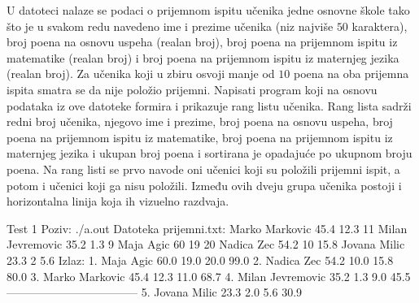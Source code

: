 \begin{Exercise}[label=705]
U datoteci  nalaze se podaci o prijemnom ispitu učenika jedne osnovne škole tako što je u svakom redu navedeno ime i prezime učenika (niz najviše $50$ karaktera), broj poena na osnovu uspeha (realan broj), broj poena na prijemnom ispitu iz matematike (realan broj) i broj poena na prijemnom ispitu iz maternjeg jezika (realan broj). Za učenika koji u zbiru osvoji manje od $10$ poena na oba prijemna ispita smatra se da nije položio prijemni. Napisati program koji na osnovu podataka iz ove datoteke formira i prikazuje rang listu učenika. Rang lista sadrži redni broj učenika, njegovo ime i prezime, broj poena na osnovu uspeha, broj poena na prijemnom ispitu iz matematike, broj poena na prijemnom ispitu iz maternjeg jezika i ukupan broj poena i sortirana je opadajuće po ukupnom broju poena. Na rang listi se prvo navode oni učenici koji su položili prijemni ispit, a potom i učenici koji ga nisu položili. Između ovih dveju grupa učenika postoji i horizontalna linija koja ih vizuelno razdvaja. 
\begin{maxitest}
\begin{test}{Test 1}
Poziv: ./a.out
Datoteka prijemni.txt:
   Marko Markovic 45.4 12.3 11         
   Milan Jevremovic 35.2 1.3 9         
   Maja Agic 60 19 20                  
   Nadica Zec 54.2 10 15.8             
   Jovana Milic 23.3 2 5.6
Izlaz:
	1. Maja Agic 60.0 19.0 20.0 99.0
	2. Nadica Zec 54.2 10.0 15.8 80.0
	3. Marko Markovic 45.4 12.3 11.0 68.7
	4. Milan Jevremovic 35.2 1.3 9.0 45.5
	-----------------------------------
	5. Jovana Milic 23.3 2.0 5.6 30.9
\end{test}
\end{maxitest}

\end{Exercise}
\begin{Answer}[ref=705]
\end{Answer}

